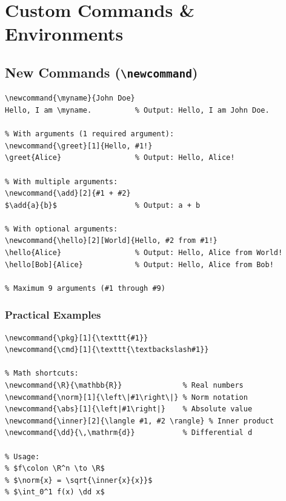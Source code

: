 
\chapter{Custom Commands \& Environments}

\section{New Commands (\texttt{\textbackslash newcommand})}

\begin{lstlisting}[language={[LaTeX]TeX}, caption=newcommand syntax]
% Basic: no arguments
\newcommand{\myname}{John Doe}
Hello, I am \myname.          % Output: Hello, I am John Doe.

% With arguments (1 required argument):
\newcommand{\greet}[1]{Hello, #1!}
\greet{Alice}                 % Output: Hello, Alice!

% With multiple arguments:
\newcommand{\add}[2]{#1 + #2}
$\add{a}{b}$                  % Output: a + b

% With optional arguments:
\newcommand{\hello}[2][World]{Hello, #2 from #1!}
\hello{Alice}                 % Output: Hello, Alice from World!
\hello[Bob]{Alice}            % Output: Hello, Alice from Bob!

% Maximum 9 arguments (#1 through #9)
\end{lstlisting}

\subsection{Practical Examples}

\begin{lstlisting}[language={[LaTeX]TeX}, caption=Practical custom commands]
% Shorthand for common formatting:
\newcommand{\pkg}[1]{\texttt{#1}}
\newcommand{\cmd}[1]{\texttt{\textbackslash#1}}

% Math shortcuts:
\newcommand{\R}{\mathbb{R}}              % Real numbers
\newcommand{\norm}[1]{\left\|#1\right\|} % Norm notation
\newcommand{\abs}[1]{\left|#1\right|}    % Absolute value
\newcommand{\inner}[2]{\langle #1, #2 \rangle} % Inner product
\newcommand{\dd}{\,\mathrm{d}}           % Differential d

% Usage:
% $f\colon \R^n \to \R$
% $\norm{x} = \sqrt{\inner{x}{x}}$
% $\int_0^1 f(x) \dd x$
\end{lstlisting}

